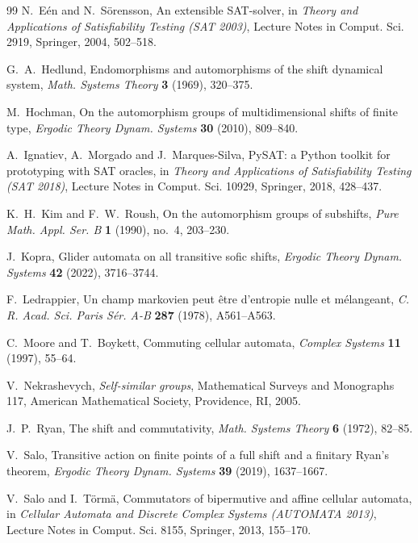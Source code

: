 \documentclass[11pt]{amsart}
\theoremstyle{definition}
\theoremstyle{remark}
\begin{document}
\begin{thebibliography}{99}
 N.~E\'en and N.~S\"orensson, An extensible SAT-solver, in \emph{Theory and Applications of Satisfiability Testing (SAT 2003)}, Lecture Notes in Comput. Sci. 2919, Springer, 2004, 502--518.

 G.~A.~Hedlund, Endomorphisms and automorphisms of the shift dynamical system, \emph{Math. Systems Theory} \textbf{3} (1969), 320--375.

 M.~Hochman, On the automorphism groups of multidimensional shifts of finite type, \emph{Ergodic Theory Dynam. Systems} \textbf{30} (2010), 809--840.

 A.~Ignatiev, A.~Morgado and J.~Marques-Silva, PySAT: a Python toolkit for prototyping with SAT oracles, in \emph{Theory and Applications of Satisfiability Testing (SAT 2018)}, Lecture Notes in Comput. Sci. 10929, Springer, 2018, 428--437.

 K.~H.~Kim and F.~W.~Roush, On the automorphism groups of subshifts, \emph{Pure Math. Appl. Ser. B} \textbf{1} (1990), no.~4, 203--230.

 J.~Kopra, Glider automata on all transitive sofic shifts, \emph{Ergodic Theory Dynam. Systems} \textbf{42} (2022), 3716--3744.

 F.~Ledrappier, Un champ markovien peut \^etre d'entropie nulle et m\'elangeant, \emph{C. R. Acad. Sci. Paris S\'er. A-B} \textbf{287} (1978), A561--A563.

 C.~Moore and T.~Boykett, Commuting cellular automata, \emph{Complex Systems} \textbf{11} (1997), 55--64.

 V.~Nekrashevych, \emph{Self-similar groups}, Mathematical Surveys and Monographs 117, American Mathematical Society, Providence, RI, 2005.

 J.~P.~Ryan, The shift and commutativity, \emph{Math. Systems Theory} \textbf{6} (1972), 82--85.

 V.~Salo, Transitive action on finite points of a full shift and a finitary Ryan's theorem, \emph{Ergodic Theory Dynam. Systems} \textbf{39} (2019), 1637--1667.

 V.~Salo and I.~T\"orm\"a, Commutators of bipermutive and affine cellular automata, in \emph{Cellular Automata and Discrete Complex Systems (AUTOMATA 2013)}, Lecture Notes in Comput. Sci. 8155, Springer, 2013, 155--170.


\end{thebibliography}
\end{document}
